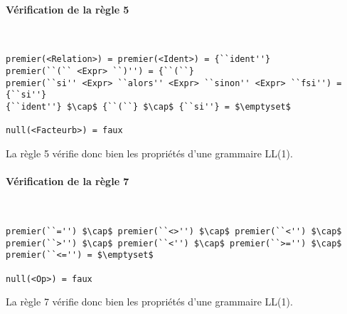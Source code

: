 \documentclass[a4paper]{article}
\begin{document}
\paragraph{Vérification de la règle 5}
~
\begin{lstlisting}
premier(<Relation>) = premier(<Ident>) = {``ident''}
premier(``(`` <Expr> ``)'') = {``(``}
premier(``si'' <Expr> ``alors'' <Expr> ``sinon'' <Expr> ``fsi'') = {``si''}
{``ident''} $\cap$ {``(``} $\cap$ {``si''} = $\emptyset$

null(<Facteurb>) = faux
\end{lstlisting}
La règle 5 vérifie donc bien les propriétés d'une grammaire LL(1).

\paragraph{Vérification de la règle 7}
~
\begin{lstlisting}
premier(``='') $\cap$ premier(``<>'') $\cap$ premier(``<'') $\cap$ premier(``>'') $\cap$ premier(``<'') $\cap$ premier(``>='') $\cap$ premier(``<='') = $\emptyset$

null(<Op>) = faux
\end{lstlisting}
La règle 7 vérifie donc bien les propriétés d'une grammaire LL(1).






\end{document}
